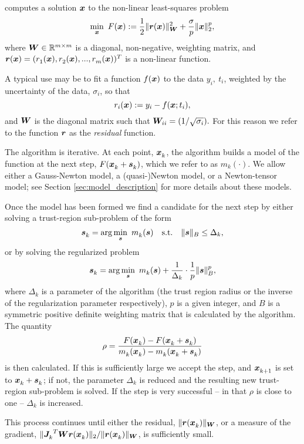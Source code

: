 {\tt \fullpackagename} computes a solution $\vx$ to the non-linear least-squares problem
\begin{equation}
\min_\vx \  F(\vx) := \frac{1}{2}\| \vr(\vx) \|_{\vW}^2 + \frac{\sigma}{p}\| \vx\|_2^p,
\label{eq:nlls_problem}
\end{equation}
where $\vW\in\mathbb{R}^{m\times m}$ is a diagonal, non-negative, weighting matrix, and $\vr(\vx) =(\comp[1]{r}(\vx), \comp[2]{r}(\vx),...,\comp[m]{r}(\vx))^T$ is a non-linear function.

A typical use may be to fit a function $f(\vx)$ to the data $y_i, \ t_i$, weighted by the uncertainty of the data, $\sigma_i$, so that
$$r_i(\vx) := y_i - f(\vx;t_i),$$
and $\vW$ is the diagonal matrix such that $\vW_{ii} = (1/\sqrt{\sigma_i}).$  For this reason 
we refer to the function $\vr$ as the \emph{residual} function.

The algorithm is iterative.
At each point, $\iter{\vx}$, the algorithm builds a model of the function at the next step, $F({\iter{\vx}+\iter{\vs}})$, which we refer to as $m_k(\cdot)$.  We allow either a Gauss-Newton model, a (quasi-)Newton model, or a Newton-tensor model; see Section \ref{sec:model_description} for more details about these models.  

Once the model has been formed we find a candidate for the next step by either solving a trust-region sub-problem of the form
\begin{equation}
\iter{\vs} = \arg \min_{\vs} \ \iter{m} (\vs) \quad \mathrm{s.t.} \quad  \|\vs\|_B \leq \Delta_k,\label{eq:tr_subproblem}
\end{equation}
or by solving the regularized problem 
\begin{equation}
\iter{\vs} = \arg \min_{\vs} \ \iter{m} (\vs)  + \frac{1}{\Delta_k}\cdot \frac{1}{p} \|\vs\|_B^p,\label{eq:reg_subproblem}
\end{equation}
where $\Delta_k$ is a parameter of the algorithm (the trust region radius or the inverse of the regularization parameter respectively), $p$ is a given integer, and $B$ is a symmetric positive definite weighting matrix that is calculated by the algorithm.
The quantity
\[\rho = \frac{F(\iter{\vx}) - F(\iter{\vx} + \iter{\vs})}{\iter{m}(\iter{\vx}) - \iter{m}(\iter{\vx} + \iter{\vs})}\]
is then calculated.
If this is sufficiently large we accept the step, and $\iter[k+1]{\vx}$ is set to $\iter{\vx} + \iter{\vs}$; if not, the parameter $\Delta_k$
is reduced and  the resulting new trust-region sub-problem is solved.  If the step is very successful -- in that $\rho$ is close to one --
$\Delta_k$ is increased.

This process continues until either the residual, $\|\vr(\iter{\vx})\|_\vW$, or a measure of the gradient,
$\|{\iter{\vJ}}^T\vW\vr(\iter{\vx})\|_2 / \|\vr(\iter{\vx})\|_\vW$, is sufficiently small.


